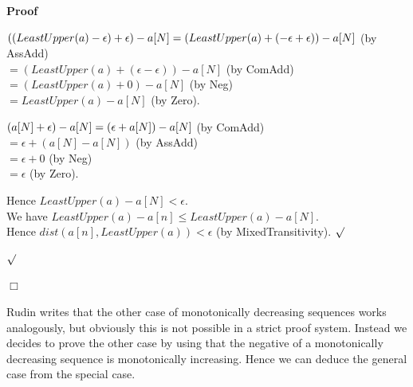 \documentclass{article}
\newenvironment{forthel}{\begin{leftbar}}{\end{leftbar}}
\newenvironment{proof}{\noindent\textbf{Proof\ }}{\hspace*{\fill}$\Box$\medskip}
\newenvironment{subproof}{\begin{list}{}{}
		\item[\text{Proof}]}{\hfill $\surd$ \end{list}}
\newcommand{\dotequal}{=}
\begin{document}
\begin{forthel}
\begin{proof}
\begin{subproof}
\begin{subproof}
				$((LeastUpper(a) - \epsilon) + \epsilon) - a[N]\\
				\dotequal (LeastUpper(a) + (-\epsilon + \epsilon)) - a[N]$ (by AssAdd)\\
				$\dotequal (LeastUpper(a) + (\epsilon - \epsilon)) - a[N]$ (by ComAdd)\\
				$\dotequal (LeastUpper(a) + 0) - a[N]$ (by Neg)\\
				$\dotequal LeastUpper(a) - a[N]$ (by Zero).
				
				$(a[N] + \epsilon) - a[N]\\ \dotequal (\epsilon + a[N]) - a[N]$ (by ComAdd)\\
				$\dotequal \epsilon + (a[N] - a[N])$ (by AssAdd)\\
				$\dotequal \epsilon + 0$ (by Neg)\\
				$\dotequal \epsilon$ (by Zero).
				
				Hence $LeastUpper(a) - a[N] < \epsilon$.\\
				We have $LeastUpper(a) - a[n] \leq LeastUpper(a) - a[N]$.\\
				Hence $dist(a[n],LeastUpper(a)) < \epsilon$ (by MixedTransitivity).
			\end{subproof}
		\end{subproof}
	\end{proof}
\end{forthel}
	
\noindent Rudin writes that the other case of monotonically decreasing sequences works analogously, but obviously this is not possible in a strict proof system. Instead we decides to prove the other case by using that the negative of a monotonically decreasing sequence is monotonically increasing. Hence we can deduce the general case from the special case.
	
\end{document}
